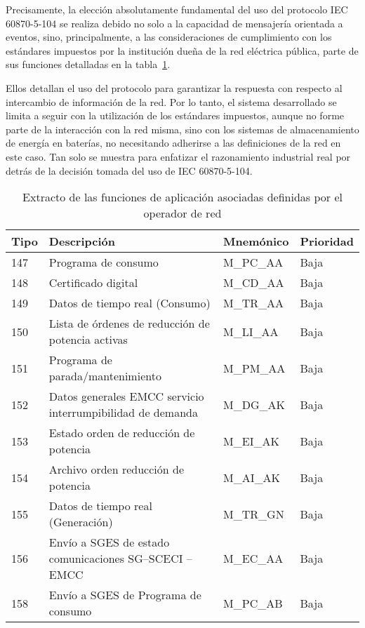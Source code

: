 Precisamente, la elección absolutamente fundamental del uso del protocolo IEC 60870-5-104 se realiza debido no solo a la capacidad de mensajería orientada a eventos, sino, principalmente, a las consideraciones de cumplimiento con los estándares impuestos por la institución dueña de la red eléctrica pública, parte de sus funciones detalladas en la tabla~\ref{tab:funciones-de-aplicación-red}.

Ellos detallan el uso del protocolo para garantizar la respuesta con respecto al intercambio de información de la red. Por lo tanto, el sistema desarrollado se limita a seguir con la utilización de los estándares impuestos, aunque no forme parte de la interacción con la red misma, sino con los sistemas de almacenamiento de energía en baterías, no necesitando adherirse a las definiciones de la red en este caso. Tan solo se muestra para enfatizar el razonamiento industrial real por detrás de la decisión tomada del uso de IEC 60870-5-104.

\begin{table}[ht]
\centering
\begin{tabular}{|l|p{7.5cm}|l|l|}
  \hline
  Tipo & Descripción                                                & Mnemónico  & Prioridad \\
  \hline
  147  & Programa de consumo                                        & M\_PC\_AA  & Baja      \\
  148  & Certificado digital                                        & M\_CD\_AA  & Baja      \\
  149  & Datos de tiempo real (Consumo)                             & M\_TR\_AA  & Baja      \\
  150  & Lista de órdenes de reducción de potencia activas          & M\_LI\_AA  & Baja      \\
  151  & Programa de parada/mantenimiento                           & M\_PM\_AA  & Baja      \\
  152  & Datos generales EMCC servicio interrumpibilidad de demanda & M\_DG\_AK  & Baja      \\
  153  & Estado orden de reducción de potencia                      & M\_EI\_AK  & Baja      \\
  154  & Archivo orden reducción de potencia                        & M\_AI\_AK  & Baja      \\
  155  & Datos de tiempo real (Generación)                          & M\_TR\_GN  & Baja      \\
  156  & Envío a SGES de estado comunicaciones SG--SCECI -- EMCC    & M\_EC\_AA  & Baja      \\
  158  & Envío a SGES de Programa de consumo                        & M\_PC\_AB  & Baja      \\
  \hline
\end{tabular}
\caption{Extracto de las funciones de aplicación asociadas definidas por el operador de red}
\label{tab:funciones-de-aplicación-red}
\end{table}

